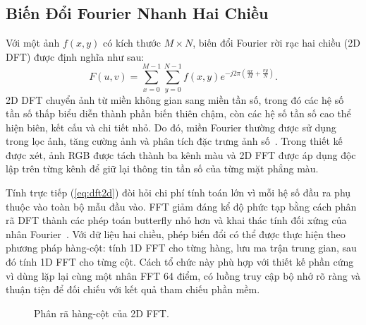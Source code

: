 ﻿\documentclass[conference]{IEEEtran}
\begin{document}
\subsection{Biến Đổi Fourier Nhanh Hai Chiều}
Với một ảnh $f(x,y)$ có kích thước $M\times N$, biến đổi Fourier rời rạc hai chiều (2D DFT) được định nghĩa như sau:
\begin{equation}
    F(u,v)=\sum_{x=0}^{M-1}\sum_{y=0}^{N-1}f(x,y)
    e^{-j2\pi\left(\frac{ux}{M}+\frac{vy}{N}\right)}.
    \label{eq:dft2d}
\end{equation}
2D DFT chuyển ảnh từ miền không gian sang miền tần số, trong đó các hệ số tần số thấp biểu diễn thành phần biến thiên chậm, còn các hệ số tần số cao thể hiện biên, kết cấu và chi tiết nhỏ. Do đó, miền Fourier thường được sử dụng trong lọc ảnh, tăng cường ảnh và phân tích đặc trưng ảnh số~\cite{gonzalez_woods_2018}. Trong thiết kế được xét, ảnh RGB được tách thành ba kênh màu và 2D FFT được áp dụng độc lập trên từng kênh để giữ lại thông tin tần số của từng mặt phẳng màu.

Tính trực tiếp (\ref{eq:dft2d}) đòi hỏi chi phí tính toán lớn vì mỗi hệ số đầu ra phụ thuộc vào toàn bộ mẫu đầu vào. FFT giảm đáng kể độ phức tạp bằng cách phân rã DFT thành các phép toán butterfly nhỏ hơn và khai thác tính đối xứng của nhân Fourier~\cite{cooley_tukey_1965,oppenheim_schafer_2010}. Với dữ liệu hai chiều, phép biến đổi có thể được thực hiện theo phương pháp hàng-cột: tính 1D FFT cho từng hàng, lưu ma trận trung gian, sau đó tính 1D FFT cho từng cột. Cách tổ chức này phù hợp với thiết kế phần cứng vì dùng lặp lại cùng một nhân FFT 64 điểm, có luồng truy cập bộ nhớ rõ ràng và thuận tiện để đối chiếu với kết quả tham chiếu phần mềm.

\begin{figure}[H]
    \centering
    \caption{Phân rã hàng-cột của 2D FFT.}
    \label{fig:row_column_fft}
\end{figure}
\end{document}
